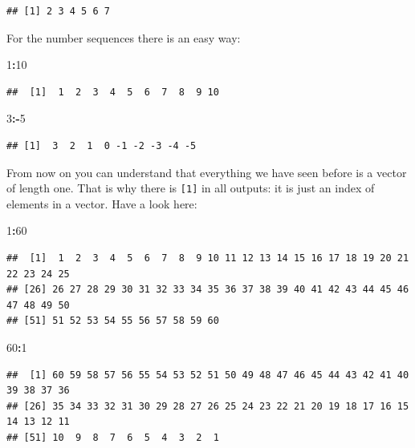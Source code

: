 \documentclass[
]{book}
\newenvironment{Shaded}{\begin{snugshade}}{\end{snugshade}}
\newcommand{\DecValTok}[1]{\textcolor[rgb]{0.00,0.00,0.81}{#1}}
\newcommand{\OperatorTok}[1]{\textcolor[rgb]{0.81,0.36,0.00}{\textbf{#1}}}
\begin{document}
\begin{verbatim}
## [1] 2 3 4 5 6 7
\end{verbatim}

For the number sequences there is an easy way:

\begin{Shaded}
\begin{Highlighting}[]
\DecValTok{1}\OperatorTok{:}\DecValTok{10}
\end{Highlighting}
\end{Shaded}

\begin{verbatim}
##  [1]  1  2  3  4  5  6  7  8  9 10
\end{verbatim}

\begin{Shaded}
\begin{Highlighting}[]
\DecValTok{3}\OperatorTok{:-}\DecValTok{5}
\end{Highlighting}
\end{Shaded}

\begin{verbatim}
## [1]  3  2  1  0 -1 -2 -3 -4 -5
\end{verbatim}

From now on you can understand that everything we have seen before is a vector of length one. That is why there is \texttt{{[}1{]}} in all outputs: it is just an index of elements in a vector. Have a look here:

\begin{Shaded}
\begin{Highlighting}[]
\DecValTok{1}\OperatorTok{:}\DecValTok{60}
\end{Highlighting}
\end{Shaded}

\begin{verbatim}
##  [1]  1  2  3  4  5  6  7  8  9 10 11 12 13 14 15 16 17 18 19 20 21 22 23 24 25
## [26] 26 27 28 29 30 31 32 33 34 35 36 37 38 39 40 41 42 43 44 45 46 47 48 49 50
## [51] 51 52 53 54 55 56 57 58 59 60
\end{verbatim}

\begin{Shaded}
\begin{Highlighting}[]
\DecValTok{60}\OperatorTok{:}\DecValTok{1}
\end{Highlighting}
\end{Shaded}

\begin{verbatim}
##  [1] 60 59 58 57 56 55 54 53 52 51 50 49 48 47 46 45 44 43 42 41 40 39 38 37 36
## [26] 35 34 33 32 31 30 29 28 27 26 25 24 23 22 21 20 19 18 17 16 15 14 13 12 11
## [51] 10  9  8  7  6  5  4  3  2  1
\end{verbatim}
\end{document}
